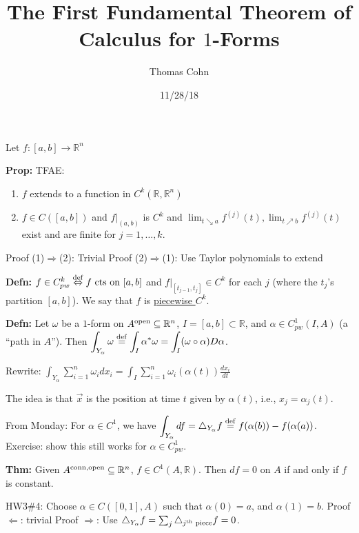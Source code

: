 \documentclass[10pt,letterpaper]{article}
\author{Thomas Cohn}
\title{The First Fundamental Theorem of Calculus for $1$-Forms}
\date{11/28/18} %
\newcommand{\n}{\hfill\break}
\newcommand{\defn}[1]{\par\noindent\settowidth{\hangindent}{\textbf{Defn: }}\textbf{Defn: }#1\n}
\newcommand{\thm}[1]{\par\noindent\settowidth{\hangindent}{\textbf{Thm: }}\textbf{Thm: }#1\n}
\newcommand{\prop}[1]{\par\noindent\settowidth{\hangindent}{\textbf{Prop: }}\textbf{Prop: }#1\n}
\newcommand{\ptxt}[1]{\textrm{\textnormal{#1}}}
\newcommand{\reals}{\mathbb{R}}
\newcommand{\R}{\reals}
\newcommand{\of}{\circ}
\begin{document}
\maketitle
\setlength\RaggedRightParindent{\parindent}
\RaggedRight

\par\noindent Let $f:[a,b]\to\R^{n}$\n

\prop{TFAE:
\begin{enumerate}[label=(\arabic*)]
	\item $f$ extends to a function in $C^{k}(\R,\R^{n})$
	\item $f\in{}C([a,b])$ and $f|_{(a,b)}$ is $C^{k}$ and $\lim_{t\searrow{}a}f^{(j)}(t),\lim_{t\nearrow{}b}f^{(j)}(t)$ exist and are finite for $j=1,\ldots,k$.
\end{enumerate}}

\par\noindent Proof (1)$\Rightarrow$(2): Trivial\n
Proof (2)$\Rightarrow$(1): Use Taylor polynomials to extend\n

\defn{$f\in{}C_{pw}^{k}\overset{\ptxt{def}}{\Leftrightarrow}f\ptxt{ cts on }[a,b]$ and $f|_{[t_{j-1},t_{j}]}\in{}C^{k}$ for each $j$ (where the $t_{j}$'s partition $[a,b]$). We say that $f$ is \underline{piecewise $C^{k}$}.}

\defn{Let $\omega$ be a $1$-form on $A^{\ptxt{open}}\subseteq\R^{n}$, $I=[a,b]\subset\R$, and $\alpha\in{}C_{pw}^{1}(I,A)$ (a ``path in $A$'').\n
Then $\displaystyle\int_{Y_{\alpha}}\omega\overset{\ptxt{def}}{=}\int_{I}\alpha^{*}\omega=\int_{I}(\omega\of\alpha)D\alpha$.}

\par\noindent Rewrite: $\displaystyle\int_{Y_{\alpha}}\sum_{i=1}^{n}\omega_{i}dx_{i}=\int_{I}\sum_{i=1}^{n}\omega_{i}(\alpha(t))\frac{dx_{i}}{dt}$\n

\par\noindent The idea is that $\vec{x}$ is the position at time $t$ given by $\alpha(t)$, i.e., $x_{j}=\alpha_{j}(t)$.\n

\par\noindent From Monday: For $\alpha\in{}C^{1}$, we have $\displaystyle\int_{Y_{\alpha}}df=\bigtriangleup_{Y_{\alpha}}f\overset{\ptxt{def}}{=}f(\alpha(b))-f(\alpha(a))$.\n
Exercise: show this still works for $\alpha\in{}C_{pw}^{1}$.\n

\thm{Given $A^{\ptxt{conn},\ptxt{open}}\subseteq\R^{n}$, $f\in{}C^{1}(A,\R)$. Then $df=0$ on $A$ if and only if $f$ is constant.}

\par\noindent HW3\#4: Choose $\alpha\in{}C([0,1],A)$ such that $\alpha(0)=a$, and $\alpha(1)=b$.\n
Proof $\Leftarrow$: trivial\n
Proof $\Rightarrow$: Use $\bigtriangleup_{Y_{\alpha}}f=\sum_{j}\bigtriangleup_{j^{\ptxt{th}}\ptxt{ piece}}f=0$.\n
\end{document}
